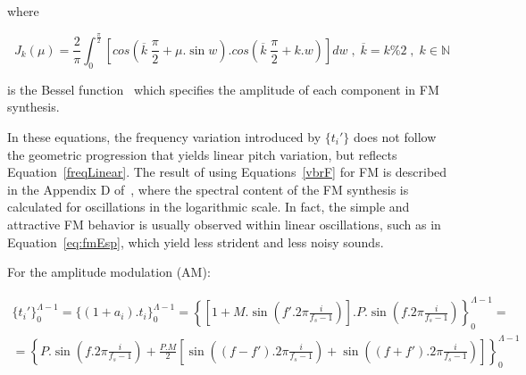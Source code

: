 \noindent where

\begin{equation}\label{eq:Bessel}
J_k(\mu) = \frac{2}{\pi} \int_0^{\frac{\pi}{2}}\left [ cos \left (\overline{k}\;\frac{\pi}{2} + \mu . \sin w \right ) . cos \left ( \overline{k}\;\frac{\pi}{2} + k . w \right ) \right ] dw \;,\; \overline{k} = k \% 2 \;,\; k \in \mathbb{N}
\end{equation}

\noindent is the Bessel function~\cite{BesselCCRMA,JOSFM} which specifies the amplitude of each component in FM synthesis.

In these equations, the frequency variation introduced by $\{t_i'\}$ does not follow the geometric progression that yields linear pitch variation, but reflects Equation~\ref{freqLinear}.
The result of using Equations~\ref{vbrF} for FM is described in the Appendix D of~\cite{dissertacao}, where the spectral content of the FM synthesis is calculated for oscillations in the logarithmic scale.
In fact, the simple and attractive FM behavior is usually observed within linear oscillations,
such as in Equation~\ref{eq:fmEsp}, which yield less strident and less noisy sounds.

For the amplitude modulation (AM):

\begin{equation}\label{eq:specAM}
\begin{split}
\{t_i'\}_0^{\Lambda-1} =\{(1+a_i) . t_i\}_0^{\Lambda-1} = \left \{ \left [ 1+M.\sin \left ( f'.2\pi\frac{i}{f_s -1} \right ) \right] .P .\sin \left ( f.2\pi\frac{i}{f_s -1} \right ) \right \}_0^{\Lambda-1} = \\ 
                        =  \left\{P.\sin \left( f.2\pi\frac{i}{f_s -1}  \right ) +  \frac{P.M}{2} \left [ \sin \left( (f-f').2\pi\frac{i}{f_s -1}  \right )  + \sin \left( (f+f').2\pi\frac{i}{f_s -1}  \right ) \right ] \right \}_0^{\Lambda-1}
\end{split}
\end{equation}


